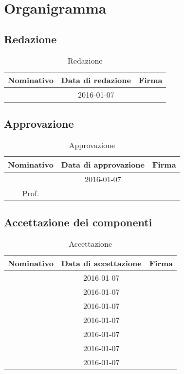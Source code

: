 \newpage
\section{Organigramma}
\subsection{Redazione}
\begin{table}[htbp]
	\begin{center}
		\setlength{\extrarowheight}{\jot}
		\begin{tabular}{|c|c|p{6cm}|}
			\hline
			\textbf{Nominativo} & \textbf{Data di redazione} & \textbf{Firma} \\[1ex]
			\hline
			\GR & 2016-01-07 & \\[1ex]
			\hline
		\end{tabular}
	\end{center}
	\caption{Redazione}
\end{table}

\subsection{Approvazione}
\begin{table}[htbp]
	\begin{center}
		\setlength{\extrarowheight}{\jot}
		\begin{tabular}{|c|c|p{5cm}|}
			\hline
			\textbf{Nominativo}     & \textbf{Data di approvazione} & \textbf{Firma}  \\[1ex]
			\hline
			\GR		& 2016-01-07					&			\\[1ex]
			\hline
			Prof. \TV	&								&			\\[1ex]
			\hline
		\end{tabular}
	\end{center}
	\caption{Approvazione}
\end{table}

\subsection{Accettazione dei componenti}
\begin{table}[htbp]
	\begin{center}
		\setlength{\extrarowheight}{\jot}
		\begin{tabular}{|c|c|p{6cm}|}
			\hline
			\textbf{Nominativo} & \textbf{Data di accettazione} & \textbf{Firma} \\[1ex]
			\hline
			\GR	&	2016-01-07	&		\\[1ex]
			\hline
			\GN		&	2016-01-07	&		\\[1ex]
			\hline
			\AF		&	2016-01-07	&		\\[1ex]
			\hline
			\FB		&	2016-01-07	&		\\[1ex]
			\hline
			\MP		&	2016-01-07	&		\\[1ex]
			\hline
			\SM		&	2016-01-07	&		\\[1ex]
			\hline
			\MV		&	2016-01-07	&		\\[1ex]
			\hline
		\end{tabular}
	\end{center}
	\caption{Accettazione}
\end{table}

